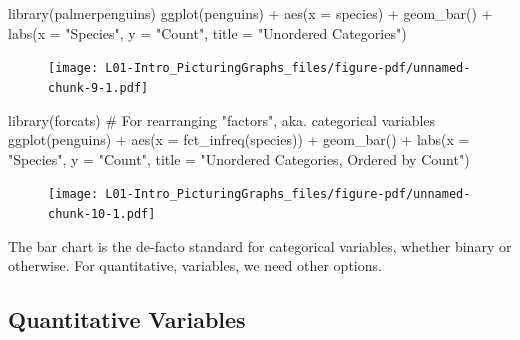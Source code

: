 \documentclass[
  letterpaper,
  DIV=11,
  numbers=noendperiod,
  oneside]{scrreprt}
\newenvironment{Shaded}{\begin{snugshade}}{\end{snugshade}}
\newcommand{\AttributeTok}[1]{\textcolor[rgb]{0.40,0.45,0.13}{#1}}
\newcommand{\CommentTok}[1]{\textcolor[rgb]{0.37,0.37,0.37}{#1}}
\newcommand{\FunctionTok}[1]{\textcolor[rgb]{0.28,0.35,0.67}{#1}}
\newcommand{\NormalTok}[1]{\textcolor[rgb]{0.00,0.23,0.31}{#1}}
\newcommand{\SpecialCharTok}[1]{\textcolor[rgb]{0.37,0.37,0.37}{#1}}
\newcommand{\StringTok}[1]{\textcolor[rgb]{0.13,0.47,0.30}{#1}}
\begin{document}
\begin{Shaded}
\begin{Highlighting}[]
\FunctionTok{library}\NormalTok{(palmerpenguins)}
\FunctionTok{ggplot}\NormalTok{(penguins) }\SpecialCharTok{+}
    \FunctionTok{aes}\NormalTok{(}\AttributeTok{x =}\NormalTok{ species) }\SpecialCharTok{+}
    \FunctionTok{geom\_bar}\NormalTok{() }\SpecialCharTok{+}
    \FunctionTok{labs}\NormalTok{(}\AttributeTok{x =} \StringTok{"Species"}\NormalTok{, }\AttributeTok{y =} \StringTok{"Count"}\NormalTok{,}
        \AttributeTok{title =} \StringTok{"Unordered Categories"}\NormalTok{)}
\end{Highlighting}
\end{Shaded}

\begin{figure}[H]

{\centering \texttt{[image: L01-Intro\_PicturingGraphs\_files/figure-pdf/unnamed-chunk-9-1.pdf]}

}

\end{figure}

\begin{Shaded}
\begin{Highlighting}[]
\FunctionTok{library}\NormalTok{(forcats) }\CommentTok{\# For rearranging "factors", aka. categorical variables}
\FunctionTok{ggplot}\NormalTok{(penguins) }\SpecialCharTok{+}
    \FunctionTok{aes}\NormalTok{(}\AttributeTok{x =} \FunctionTok{fct\_infreq}\NormalTok{(species)) }\SpecialCharTok{+}
    \FunctionTok{geom\_bar}\NormalTok{() }\SpecialCharTok{+}
    \FunctionTok{labs}\NormalTok{(}\AttributeTok{x =} \StringTok{"Species"}\NormalTok{, }\AttributeTok{y =} \StringTok{"Count"}\NormalTok{,}
        \AttributeTok{title =} \StringTok{"Unordered Categories, Ordered by Count"}\NormalTok{)}
\end{Highlighting}
\end{Shaded}

\begin{figure}[H]

{\centering \texttt{[image: L01-Intro\_PicturingGraphs\_files/figure-pdf/unnamed-chunk-10-1.pdf]}

}

\end{figure}

The bar chart is the de-facto standard for categorical variables,
whether binary or otherwise. For quantitative, variables, we need other
options.

\hypertarget{quantitative-variables}{%
\subsection{Quantitative Variables}\label{quantitative-variables}}
\end{document}
